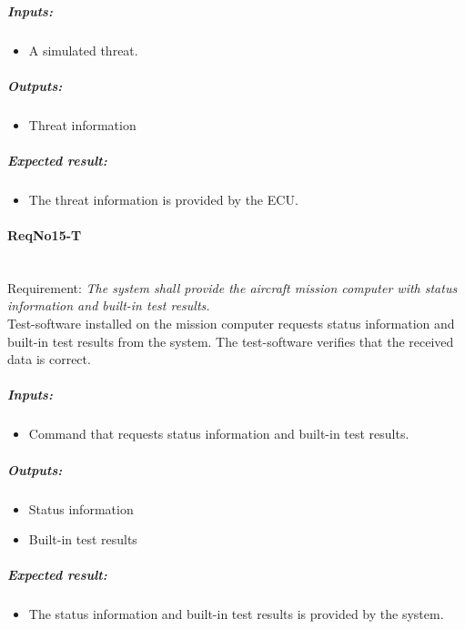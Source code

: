 	\subparagraph{Inputs:}
	\begin{itemize}
	\item A simulated threat. 
	\end{itemize}
	\subparagraph{Outputs:}
	\begin{itemize}
	\item Threat information
	\end{itemize}
	\subparagraph{Expected result:}
	\begin{itemize}
	\item The threat information is provided by the ECU.
	\end{itemize}
	

\paragraph{ReqNo15-T}\mbox{}\\ %
Requirement: \textit{The system shall provide the aircraft mission computer
with status information and built-in test results.}
\\
Test-software installed on the mission computer requests status information and built-in test results from the system. The test-software verifies that the received data is correct.
\\
	\subparagraph{Inputs:}
	\begin{itemize}
	\item Command that requests status information and built-in test results. 
	\end{itemize}
	\subparagraph{Outputs:}
	\begin{itemize}
	\item Status information
	\item Built-in test results
	\end{itemize}
	\subparagraph{Expected result:}
	\begin{itemize}
	\item The status information and built-in test results is provided by the system.
	\end{itemize}

